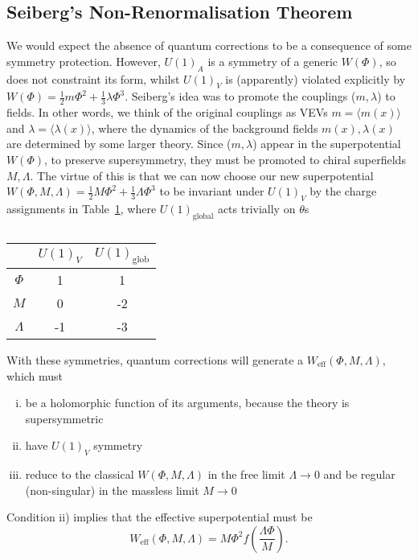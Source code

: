 \subsection{Seiberg's Non-Renormalisation Theorem}%
\label{sub:seiberg_s_non_renormalisation_theorem}

We would expect the absence of quantum corrections to be a consequence of some symmetry protection. However, $U(1)_A$ is a symmetry of a generic $W(\Phi)$, so does not constraint its form, whilst $U(1)_V$ is (apparently) violated explicitly by $W(\Phi) = \frac{1}{2} m \Phi^2 + \frac{1}{3} \lambda \Phi^3$.
Seiberg's idea was to promote the couplings ($m, \lambda$) to fields. In other words, we think of the original couplings as VEVs $m = \langle m(x) \rangle$ and $\lambda = \langle \lambda(x) \rangle$, where the dynamics of the background fields $m(x), \lambda(x)$ are determined by some larger theory.
Since ($m, \lambda$) appear in the superpotential $W(\Phi)$, to preserve supersymmetry, they must be promoted to chiral superfields $M, \Lambda$. The virtue of this is that we can now choose our new superpotential $W(\Phi, M, \Lambda) = \frac{1}{2} M \Phi^2 + \frac{1}{3} \Lambda \Phi^3$ to be invariant under $U(1)_V$ by the charge assignments in Table~\ref{tab:l14t1}, where $U(1)_{\text{global}}$ acts trivially on $\theta$s
\begin{table}[htpb]
  \centering
  \begin{tabular}{c | c c}
     & $U(1)_V$ & $U(1)_{\text{glob}}$ \\
     \hline
    $\Phi$ & 1 & 1 \\
    $M$ & 0 & -2 \\
    $\Lambda$ & -1 & -3 \\
  \end{tabular}
  \caption{}
  \label{tab:l14t1}
\end{table}
With these symmetries, quantum corrections will generate a $W_{\text{eff}}(\Phi, M, \Lambda)$, which must
\begin{enumerate}[i)]
  \item be a holomorphic function of its arguments, because the theory is supersymmetric
  \item have $U(1)_V$ symmetry
  \item reduce to the classical $W(\Phi, M, \Lambda)$ in the free limit $\Lambda \to 0$ and be regular (non-singular) in the massless limit $M \to 0$
\end{enumerate}
Condition ii) implies that the effective superpotential must be
\begin{equation}
  W_{\text{eff}}(\Phi, M, \Lambda) = M \Phi^2 f(\frac{\Lambda \Phi}{M}).
\end{equation}
